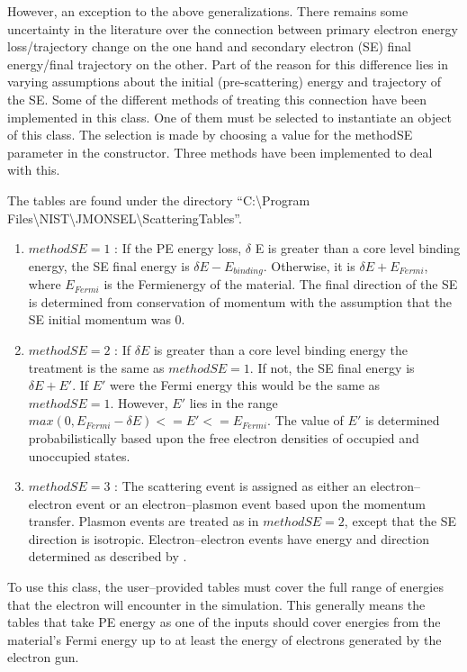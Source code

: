 However, an exception to the above generalizations. There remains some uncertainty in the literature over the connection between primary electron energy loss/trajectory change on the one hand and secondary electron (SE) final energy/final trajectory on the other. Part of the reason for this difference lies in varying assumptions about the initial (pre-scattering) energy and trajectory of the SE. Some of the different methods of treating this connection have been implemented in this class. One of them must be selected to instantiate an object of this class. The selection is made by choosing a value for the methodSE parameter in the constructor. Three methods have been implemented to deal with this.

The tables are found under the directory ``C:\textbackslash Program Files\textbackslash NIST\textbackslash JMONSEL\textbackslash ScatteringTables''.

\begin{enumerate}
    \item $methodSE=1$ \cite{ding1996monte}: If the PE energy loss, $\delta$ E is greater than a core level binding energy, the SE final energy is $\delta E-E_{binding}$. Otherwise, it is $\delta E + E_{Fermi}$, where $E_{Fermi}$ is the Fermienergy of the material. The final direction of the SE is determined from conservation of momentum with the assumption that the SE initial momentum was 0.
    \item $methodSE=2$ \cite{ding2001monte}: If $\delta E$ is greater than a core level binding energy the treatment is the same as $methodSE=1$. If not, the SE final energy is $\delta E + E'$. If $E'$ were the Fermi energy this would be the same as $methodSE = 1$. However, $E'$ lies in the range $max(0, E_{Fermi} - \delta E) <= E' <= E_{Fermi}$. The value of $E'$ is determined probabilistically based upon the free electron densities of occupied and unoccupied states.
    \item $methodSE=3$ \cite{mao2008electron}: The scattering event is assigned as either an electron--electron event or an electron--plasmon event based upon the momentum transfer. Plasmon events are treated as in $methodSE = 2$, except that the SE direction is isotropic. Electron--electron events have energy and direction determined as described by \cite{mao2008electron}.
\end{enumerate}

To use this class, the user--provided tables must cover the full range of energies that the electron will encounter in the simulation. This generally means the tables that take PE energy as one of the inputs should cover energies from the material's Fermi energy up to at least the energy of electrons generated by the electron gun.

